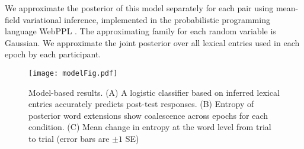 We approximate the posterior of this model separately for each pair using mean-field variational inference, implemented in the probabilistic programming language WebPPL \cite{GoodmanStuhlmuller14_DIPPL,DAIPP}. 
The approximating family for each random variable is Gaussian. We approximate the joint posterior over all lexical entries used in each epoch by each participant. 


\begin{figure*}[t]
\begin{center}
\texttt{[image: modelFig.pdf]}
\vspace{-1ex}
{\caption{{Model-based results. (A) A logistic classifier based on inferred lexical entries accurately predicts post-test responses. (B) Entropy of posterior word extensions show coalescence across epochs for each condition. (C) Mean change in entropy at the word level from trial to trial (error bars are $\pm 1$ SE)}  \label{fig:postTestPrediction}}}
\end{center}
\vspace{-3ex}
\end{figure*}




